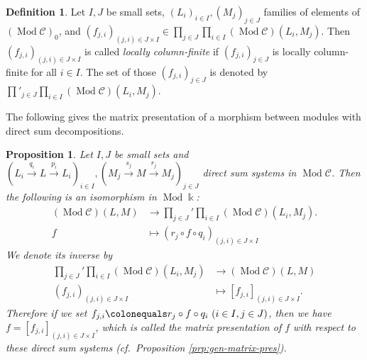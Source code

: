 \documentclass{surv-l}
\numberwithin{equation}{chapter}
\numberwithin{figure}{chapter}
\theoremstyle{plain}
\newtheorem{prp}[thm]{Proposition}
\theoremstyle{definition}
\newtheorem{dfn}[thm]{Definition}
\theoremstyle{remark}
\DeclareMathOperator{\Mod}{Mod}
\begin{document}
\begin{dfn}
Let $I, J$ be small sets,
$(L_i)_{i\in I}, (M_j)_{j\in J}$ families of elements of $(\Mod{\mathcal{C}})_0$, and
$(f_{j,i})_{(j,i)\in J \times I} \in \prod_{j\in J}\prod_{i\in I}(\Mod{\mathcal{C}})(L_i, M_j)$.
Then $(f_{j,i})_{(j,i)\in J \times I}$ is called \emph{locally column-finite} if $(f_{j,i})_{j\in J}$ is locally column-finite for all $i \in I$.
The set of those $(f_{j,i})_{j\in J}$ is denoted by
$\prod'_{j\in J}\prod_{i\in I}(\Mod{\mathcal{C}})(L_i, M_j)$.
\end{dfn}

The following gives the matrix presentation of a morphism
between modules with direct sum decompositions.

\begin{prp}
\label{prp:mat-pres-ds-ds}
Let $I, J$ be small sets and
$(L_i \xrightarrow{q_i} L \xrightarrow{p_i} L_i)_{i \in I},
(M_j \xrightarrow{s_j} M \xrightarrow{r_j} M_j)_{j \in J}$
direct sum systems in $\Mod{\mathcal{C}}$.
Then the following is an isomorphism in $\Mod\Bbbk$:
\[
\begin{aligned}
(\Mod{\mathcal{C}})(L, M) &\to
{\prod_{j\in J}}'\prod_{i\in I}(\Mod{\mathcal{C}})(L_i, M_j).\\
f &\mapsto (r_j \circ f \circ q_i)_{(j,i)\in J\times I}
\end{aligned}
\]
We denote its inverse by
\[
\begin{aligned}
{\prod_{j\in J}}'\prod_{i\in I}(\Mod{\mathcal{C}})(L_i, M_j) &\to
(\Mod{\mathcal{C}})(L, M)\\
(f_{j,i})_{(j,i)\in J\times I} &\mapsto [f_{j,i}]_{(j,i)\in J\times I}.
\end{aligned}
\]
Therefore if we set $f_{j,i}\colonequals  r_j \circ f \circ q_i \ (i\in I, j \in J)$, then
we have $f = [f_{j,i}]_{(j,i)\in J\times I}$,
which is called the \emph{matrix presentation} of $f$ with respect to
these direct sum systems {\rm (cf.\ Proposition \ref{prp:gen-matrix-pres})}.
\end{prp}
\end{document}
